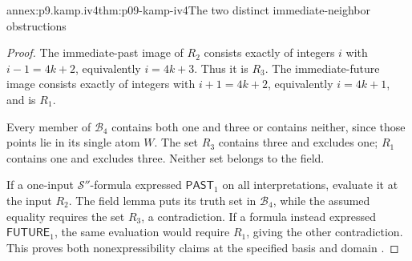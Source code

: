 \begin{annexitem}{annex:p9.kamp.iv4}{thm:p09-kamp-iv4}{The two distinct immediate-neighbor obstructions}
\begin{proof}
The immediate-past image of \(R_2\) consists exactly
of integers \(i\) with \(i-1=4k+2\), equivalently
\(i=4k+3\). Thus it is \(R_3\). The immediate-future
image consists exactly of integers with \(i+1=4k+2\),
equivalently \(i=4k+1\), and is \(R_1\).

Every member of \(\mathcal B_4\) contains both one
and three or contains neither, since those points lie
in its single atom \(W\). The set \(R_3\) contains
three and excludes one; \(R_1\) contains one and
excludes three. Neither set belongs to the field.

If a one-input \(\mathcal S''\)-formula expressed
\(\mathsf{PAST}_1\) on all interpretations, evaluate it
at the input \(R_2\). The field lemma puts its truth
set in \(\mathcal B_4\), while the assumed equality
requires the set \(R_3\), a contradiction. If a formula
instead expressed \(\mathsf{FUTURE}_1\), the same
evaluation would require \(R_1\), giving the other
contradiction. This proves both nonexpressibility claims
at the specified basis and domain
\cite[ch.~IV, thm.~4, pp.~108--109]{Kamp1968}.
\end{proof}
\end{annexitem}

